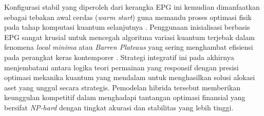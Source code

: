 Konfigurasi stabil yang diperoleh dari kerangka EPG ini kemudian dimanfaatkan sebagai tebakan awal cerdas (\textit{warm start}) guna memandu proses optimasi fisik pada tahap komputasi kuantum selanjutnya \cite{jain_multi-portfolio_2012}. Penggunaan inisialisasi berbasis EPG sangat krusial untuk mencegah algoritma variasi kuantum terjebak dalam fenomena \textit{local minima} atau \textit{Barren Plateaus} yang sering menghambat efisiensi pada perangkat keras kontemporer \cite{mcclean_barren_2018}. Strategi integratif ini pada akhirnya menjembatani antara logika teori permainan yang responsif dengan presisi optimasi mekanika kuantum yang mendalam untuk menghasilkan solusi alokasi aset yang unggul secara strategis. Pemodelan hibrida tersebut memberikan keunggulan kompetitif dalam menghadapi tantangan optimasi finansial yang bersifat \textit{NP-hard} dengan tingkat akurasi dan stabilitas yang lebih tinggi.

